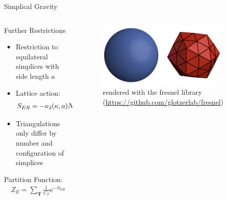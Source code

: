 \begin{frame}{Simplical Gravity}
 \begin{columns}
  \begin{column}{0.52\textwidth}
   \begin{block}{Further Restrictions}
    \vspace{0pt}
    \begin{itemize}
     \item Restriction to equilateral simplices with side length $a$
     \item Lattice action:\begin{align*}
            S_{ER} = - \kappa_2(\kappa,a) N_2 + \kappa_4(\kappa,\Lambda, a) N_4 + \lambda\abs{N_4 - V}
           \end{align*}
     \item Triangulations only differ by number and configuration of simplices
    \end{itemize}
    \begin{block}{Partition Function:}
     \vspace{0pt}
     \begin{align*}
      Z_E = \sum_{\boldsymbol{T}} \frac{1}{C_T} \mathrm{e}^{-S_{ER}}
     \end{align*}
    \end{block}
   \end{block}
  \end{column}
  \begin{column}{0.46\textwidth}
   \begin{figure}
    \centering
    \includegraphics[width=0.9\textwidth]{pics/triangulation-ico.png}
    \caption{\tiny{rendered with the fresnel library (\url{https://github.com/glotzerlab/fresnel})}}
   \end{figure}
  \end{column}
 \end{columns}
\end{frame}

